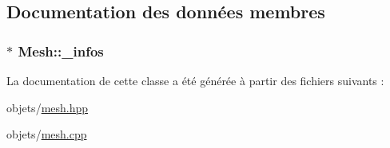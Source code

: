 \subsection{Documentation des données membres}
\hypertarget{class_mesh_a608911b8dbff58ff769c708b8b7f2618}{
\subsubsection[{\+\_\+infos}]{$\ast$ Mesh\+::\+\_\+infos\hspace{0.3cm}{\ttfamily [private]}}}\label{class_mesh_a608911b8dbff58ff769c708b8b7f2618}


La documentation de cette classe a été générée à partir des fichiers suivants \+:\begin{DoxyCompactItemize}
\item 
objets/\hyperlink{mesh_8hpp}{mesh.\+hpp}\item 
objets/\hyperlink{mesh_8cpp}{mesh.\+cpp}\end{DoxyCompactItemize}
